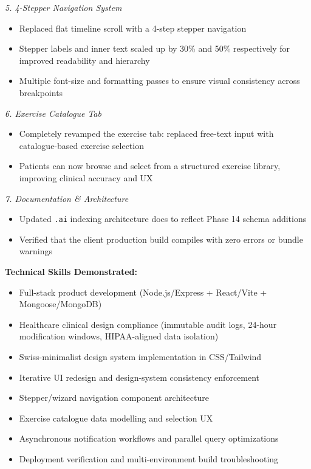 \documentclass[11pt,a4paper]{article}
\begin{document}
\textit{5. 4-Stepper Navigation System}
\begin{itemize}
  \item Replaced flat timeline scroll with a 4-step stepper navigation
  \item Stepper labels and inner text scaled up by 30\% and 50\% respectively for improved
        readability and hierarchy
  \item Multiple font-size and formatting passes to ensure visual consistency across
        breakpoints
\end{itemize}

\textit{6. Exercise Catalogue Tab}
\begin{itemize}
  \item Completely revamped the exercise tab: replaced free-text input with catalogue-based
        exercise selection
  \item Patients can now browse and select from a structured exercise library, improving
        clinical accuracy and UX
\end{itemize}

\textit{7. Documentation \& Architecture}
\begin{itemize}
  \item Updated \texttt{.ai} indexing architecture docs to reflect Phase 14 schema additions
  \item Verified that the client production build compiles with zero errors or bundle warnings
\end{itemize}

\textbf{Technical Skills Demonstrated:}
\begin{itemize}
  \item Full-stack product development (Node.js/Express + React/Vite + Mongoose/MongoDB)
  \item Healthcare clinical design compliance (immutable audit logs, 24-hour modification
        windows, HIPAA-aligned data isolation)
  \item Swiss-minimalist design system implementation in CSS/Tailwind
  \item Iterative UI redesign and design-system consistency enforcement
  \item Stepper/wizard navigation component architecture
  \item Exercise catalogue data modelling and selection UX
  \item Asynchronous notification workflows and parallel query optimizations
  \item Deployment verification and multi-environment build troubleshooting
\end{itemize}
\end{document}
